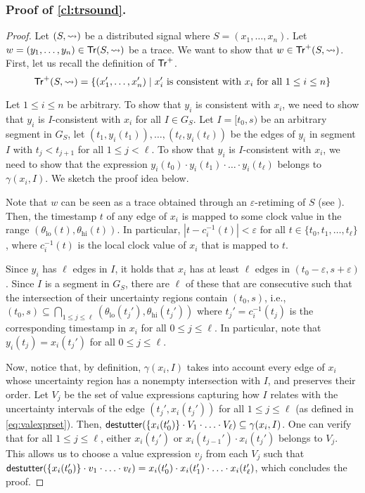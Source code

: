 \subsubsection{Proof of \cref{cl:trsound}.}
\begin{proof}
	Let $(S,{\rightsquigarrow})$ be a distributed signal where $S = (x_1, \ldots, x_n)$.
	Let $w = (y_1, \ldots, y_n) \in \mathsf{Tr}(S,{\rightsquigarrow})$ be a trace.
	We want to show that $w \in \mathsf{Tr}^+(S,{\rightsquigarrow})$.
	First, let us recall the definition of $\mathsf{Tr}^+$.
	\[ \tr^+(S,{\hb}) = \{ (x_1', \ldots, x_n') \st \text{$x_i'$ is consistent with $x_i$ for all $1 \leq i \leq n$}\} \]
	
	Let $1 \leq i \leq n$ be arbitrary.
	To show that $y_i$ is consistent with $x_i$, we need to show that $y_i$ is $I$-consistent with $x_i$ for all $I \in G_S$.
	Let $I = [t_0, s)$ be an arbitrary segment in $G_S$, let $(t_1, y_i(t_1)), \ldots, (t_\ell, y_i(t_\ell))$ be the edges of $y_i$ in segment $I$ with $t_j < t_{j+1}$ for all $1 \leq j < \ell$.
	To show that $y_i$ is $I$-consistent with $x_i$, we need to show that the expression $y_i(t_0) \cdot y_i(t_1) \cdot \ldots \cdot y_i(t_\ell)$ belongs to $\gamma(x_i,I)$.
	We sketch the proof idea below.
	
	Note that $w$ can be seen as a trace obtained through an $\varepsilon$-retiming of $S$ (see \cite[Section 4.2]{MomtazAB23}).
	Then, the timestamp $t$ of any edge of $x_i$ is mapped to some clock value in the range $(\theta_{\text{lo}}(t), \theta_{\text{hi}}(t))$.
	In particular, $|t - c^{-1}_i(t)| < \varepsilon$ for all $t \in \{t_0, t_1, \ldots, t_\ell\}$, where $c^{-1}_i(t)$ is the local clock value of $x_i$ that is mapped to $t$.
	
	Since $y_i$ has $\ell$ edges in $I$, it holds that $x_i$ has at least $\ell$ edges in $(t_0 - \varepsilon, s + \varepsilon)$.
	Since $I$ is a segment in $G_S$, there are $\ell$ of these that are consecutive such that the intersection of their uncertainty regions contain $(t_0,s)$, i.e., $(t_0,s) \subseteq \bigcap_{1 \leq j \leq \ell} (\theta_{\text{lo}}(t_j'), \theta_{\text{hi}}(t_j'))$ where $t_j' = c^{-1}_i(t_j)$ is the corresponding timestamp in $x_i$ for all $0 \leq j \leq \ell$.
	In particular, note that $y_i(t_j) = x_i(t_j')$ for all $0 \leq j \leq \ell$.
		
	Now, notice that, by definition, $\gamma(x_i, I)$ takes into account every edge of $x_i$ whose uncertainty region has a nonempty intersection with $I$, and preserves their order.
	Let $V_j$ be the set of value expressions capturing how $I$ relates with the uncertainty intervals of the edge $(t_j', x_i(t_j'))$ for all $1 \leq j \leq \ell$ (as defined in \cref{eq:valexprset}).
	Then, $\mathsf{destutter}(\{x_i(t_0')\} \cdot V_1 \cdot \ldots \cdot V_\ell) \subseteq \gamma(x_i, I)$.
	One can verify that for all $1 \leq j \leq \ell$, either $x_i(t_j')$ or $x_i(t_{j-1}') \cdot x_i(t_j')$ belongs to $V_j$.
	This allows us to choose a value expression $v_j$ from each $V_j$ such that $\mathsf{destutter}(\{x_i(t_0')\} \cdot v_1 \cdot \ldots \cdot v_\ell) = x_i(t_0') \cdot x_i(t_1') \cdot \ldots \cdot x_i(t_\ell')$, which concludes the proof. 


\end{proof}
